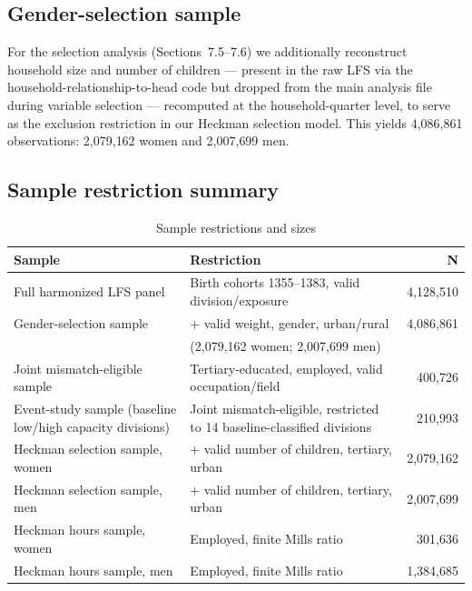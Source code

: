 \documentclass[11pt]{article}
\begin{document}
\subsection{Gender-selection sample}

For the selection analysis (Sections~7.5--7.6) we additionally reconstruct household size and number of children --- present in the raw LFS via the household-relationship-to-head code but dropped from the main analysis file during variable selection --- recomputed at the household-quarter level, to serve as the exclusion restriction in our Heckman selection model. This yields 4{,}086{,}861 observations: 2{,}079{,}162 women and 2{,}007{,}699 men.

\subsection{Sample restriction summary}

\begin{table}[htbp]
\centering
\caption{Sample restrictions and sizes}
\label{tab:samples}
\small
\begin{tabular}{p{4.3cm}p{6cm}r}
\toprule
Sample & Restriction & N \\
\midrule
Full harmonized LFS panel & Birth cohorts 1355--1383, valid division/exposure & 4{,}128{,}510 \\
Gender-selection sample & + valid weight, gender, urban/rural & 4{,}086{,}861 \\
 & \quad (2{,}079{,}162 women; 2{,}007{,}699 men) & \\
Joint mismatch-eligible sample & Tertiary-educated, employed, valid occupation/field & 400{,}726 \\
Event-study sample (baseline low/high capacity divisions) & Joint mismatch-eligible, restricted to 14 baseline-classified divisions & 210{,}993 \\
Heckman selection sample, women & + valid number of children, tertiary, urban & 2{,}079{,}162 \\
Heckman selection sample, men & + valid number of children, tertiary, urban & 2{,}007{,}699 \\
Heckman hours sample, women & Employed, finite Mills ratio & 301{,}636 \\
Heckman hours sample, men & Employed, finite Mills ratio & 1{,}384{,}685 \\
\bottomrule
\end{tabular}
\end{table}
\end{document}
